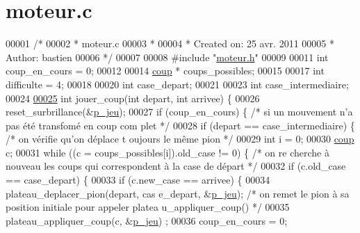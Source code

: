 \hypertarget{moteur_8c_source}{
\section{moteur.c}
}

\begin{DoxyCode}
00001 \textcolor{comment}{/*}
00002 \textcolor{comment}{ * moteur.c}
00003 \textcolor{comment}{ *}
00004 \textcolor{comment}{ *  Created on: 25 avr. 2011}
00005 \textcolor{comment}{ *      Author: bastien}
00006 \textcolor{comment}{ */}
00007 
00008 \textcolor{preprocessor}{#include "\hyperlink{moteur_8h}{moteur.h}"}
00009 
00011 \textcolor{keywordtype}{int} coup\_en\_cours = 0;
00012 
00014 \hyperlink{structcoup}{coup} * coups\_possibles;
00015 
00017 \textcolor{keywordtype}{int} difficulte = 4;
00018 
00020 \textcolor{keywordtype}{int} case\_depart;
00021 
00023 \textcolor{keywordtype}{int} case\_intermediaire;
00024 
\hypertarget{moteur_8c_source_l00025}{}\hyperlink{moteur_8h_afd3360329886ee6f8e2a71a172a4a808}{00025} \textcolor{keywordtype}{int} jouer\_coup(\textcolor{keywordtype}{int} depart, \textcolor{keywordtype}{int} arrivee) \{
00026         reset\_surbrillance(&\hyperlink{moteur_8h_a3efa8d0f7c65daedc584dc8db048e62c}{p_jeu});
00027         \textcolor{keywordflow}{if} (coup\_en\_cours) \{ \textcolor{comment}{/* si un mouvement n'a pas été transfomé en coup com
      plet */}
00028                 \textcolor{keywordflow}{if} (depart == case\_intermediaire) \{ \textcolor{comment}{/* on vérifie qu'on déplace t
      oujours le même pion */}
00029                         \textcolor{keywordtype}{int} i = 0;
00030                         \hyperlink{structcoup}{coup} c;
00031                         \textcolor{keywordflow}{while} ((c = coups\_possibles[i]).old\_case != 0) \{ \textcolor{comment}{/* on re
      cherche à nouveau les coups qui correspondent à la case de départ */}
00032                                 \textcolor{keywordflow}{if} (c.old\_case == case\_depart) \{
00033                                         \textcolor{keywordflow}{if} (c.new\_case == arrivee) \{
00034                                                 plateau\_deplacer\_pion(depart, cas
      e\_depart, &\hyperlink{moteur_8h_a3efa8d0f7c65daedc584dc8db048e62c}{p_jeu}); \textcolor{comment}{/* on remet le pion à sa position initiale pour appeler platea
      u\_appliquer\_coup() */}
00035                                                 plateau\_appliquer\_coup(c, &\hyperlink{moteur_8h_a3efa8d0f7c65daedc584dc8db048e62c}{p_jeu})
      ;
00036                                                 coup\_en\_cours = 0;

\end{DoxyCode}
